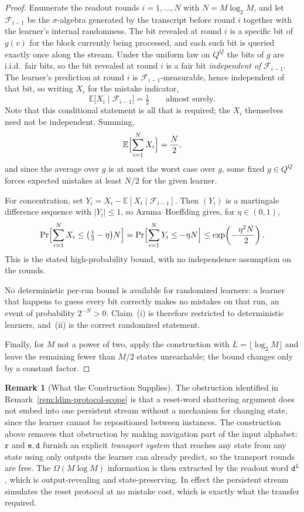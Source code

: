 \documentclass[12pt]{article}
\theoremstyle{definition}
\newtheorem{remark}[theorem]{Remark}
\begin{document}
\begin{proof}
Enumerate the readout rounds $i=1,\dots,N$ with $N=M\log_2M$, and let
$\mathcal F_{i-1}$ be the $\sigma$-algebra generated by the transcript before
round $i$ together with the learner's internal randomness.  The bit revealed
at round $i$ is a specific bit of $g(v)$ for the block currently being
processed, and each such bit is queried exactly once along the stream.  Under
the uniform law on $Q^Q$ the bits of $g$ are i.i.d.\ fair bits, so the bit
revealed at round $i$ is a fair bit \emph{independent of} $\mathcal F_{i-1}$.
The learner's prediction at round $i$ is $\mathcal F_{i-1}$-measurable, hence
independent of that bit, so writing $X_i$ for the mistake indicator,
\[
\mathbb E\bigl[X_i\mid\mathcal F_{i-1}\bigr]=\tfrac12
\qquad\text{almost surely.}
\]
Note that this conditional statement is all that is required; the $X_i$
themselves need not be independent.  Summing,
\[
\mathbb E\Bigl[\sum_{i=1}^NX_i\Bigr]=\frac N2 ,
\]
and since the average over $g$ is at most the worst case over $g$, some fixed
$g\in Q^Q$ forces expected mistakes at least $N/2$ for the given learner.

For concentration, set $Y_i=X_i-\mathbb E[X_i\mid\mathcal F_{i-1}]$.  Then
$(Y_i)$ is a martingale difference sequence with $|Y_i|\le1$, so
Azuma--Hoeffding \cite[Ch.~2]{boucheron2013} gives, for $\eta\in(0,1)$,
\[
\Pr\Bigl[\sum_{i=1}^NX_i\le\bigl(\tfrac12-\eta\bigr)N\Bigr]
=
\Pr\Bigl[\sum_{i=1}^NY_i\le-\eta N\Bigr]
\le
\exp\!\left(-\frac{\eta^2N}{2}\right).
\]
This is the stated high-probability bound, with no independence assumption on
the rounds.

No deterministic per-run bound is available for randomized learners: a learner
that happens to guess every bit correctly makes no mistakes on that run, an
event of probability $2^{-N}>0$.  Claim~(i) is therefore restricted to
deterministic learners, and~(ii) is the correct randomized statement.

Finally, for $M$ not a power of two, apply the construction with
$L=\lfloor\log_2M\rfloor$ and leave the remaining fewer than $M/2$ states
unreachable; the bound changes only by a constant factor.
\end{proof}

\begin{remark}[What the Construction Supplies]
\label{rem:stream-lb-mechanism}
The obstruction identified in Remark~\ref{rem:ldim-protocol-scope} is that a
reset-word shattering argument does not embed into one persistent stream
without a mechanism for changing state, since the learner cannot be
repositioned between instances.  The
construction above removes that obstruction by making navigation part of the
input alphabet: $\mathtt r$ and $\mathtt e,\mathtt d$ furnish an explicit
\emph{transport system} that reaches any state from any state using only
outputs the learner can already predict, so the transport rounds are free.  The
$\Omega(M\log M)$ information is then extracted by the readout word
$\mathtt d^L$, which is output-revealing and state-preserving.  In effect the
persistent stream simulates the reset protocol at no mistake cost, which is
exactly what the transfer required.
\end{remark}
\end{document}
